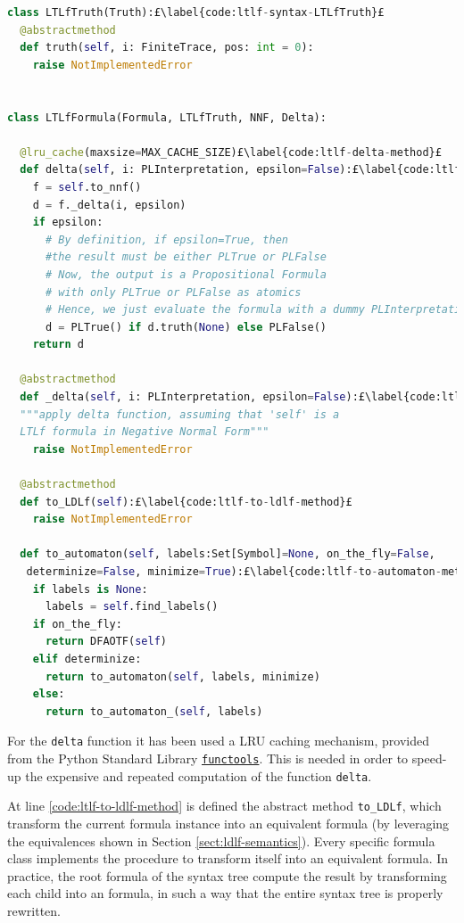 \begin{lstlisting}[language=Python, style=Python,  escapechar = £, label={code:ltlf-syntax-LTLfFormula}, caption={The \texttt{LTLfFormula} abstraction (\href{https://github.com/MarcoFavorito/flloat/blob/0.1.4/flloat/syntax/ltlf.py}{flloat/syntax/ltlf.py)}}]
class LTLfTruth(Truth):£\label{code:ltlf-syntax-LTLfTruth}£
  @abstractmethod
  def truth(self, i: FiniteTrace, pos: int = 0):
    raise NotImplementedError


class LTLfFormula(Formula, LTLfTruth, NNF, Delta):

  @lru_cache(maxsize=MAX_CACHE_SIZE)£\label{code:ltlf-delta-method}£
  def delta(self, i: PLInterpretation, epsilon=False):£\label{code:ltlf-delta-method}£
    f = self.to_nnf()
    d = f._delta(i, epsilon)
    if epsilon:
      # By definition, if epsilon=True, then 
      #the result must be either PLTrue or PLFalse
      # Now, the output is a Propositional Formula
      # with only PLTrue or PLFalse as atomics
      # Hence, we just evaluate the formula with a dummy PLInterpretation
      d = PLTrue() if d.truth(None) else PLFalse()
    return d

  @abstractmethod
  def _delta(self, i: PLInterpretation, epsilon=False):£\label{code:ltlf-_delta-method}£
  """apply delta function, assuming that 'self' is a 
  LTLf formula in Negative Normal Form"""
    raise NotImplementedError

  @abstractmethod
  def to_LDLf(self):£\label{code:ltlf-to-ldlf-method}£
    raise NotImplementedError

  def to_automaton(self, labels:Set[Symbol]=None, on_the_fly=False,
   determinize=False, minimize=True):£\label{code:ltlf-to-automaton-method}£
    if labels is None:
      labels = self.find_labels()
    if on_the_fly:
      return DFAOTF(self)
    elif determinize:
      return to_automaton(self, labels, minimize)
    else:
      return to_automaton_(self, labels)
\end{lstlisting}
For the \texttt{delta} function it has been used a LRU caching mechanism, provided from the Python Standard Library \href{https://docs.python.org/3/library/functools.html}{\texttt{functools}}. This is needed in order to speed-up the expensive and repeated computation of the function \texttt{delta}.

At line \ref{code:ltlf-to-ldlf-method} is defined the abstract method \texttt{to\_LDLf}, which transform the current \LTLf formula instance into an \LDLf equivalent formula (by leveraging the equivalences shown in Section \ref{sect:ldlf-semantics}). Every specific \LTLf formula class implements the procedure to transform itself into an equivalent \LDLf formula. In practice, the root formula of the \LTLf syntax tree compute the result by transforming each child into an \LDLf formula, in such a way that the entire syntax tree is properly rewritten.

